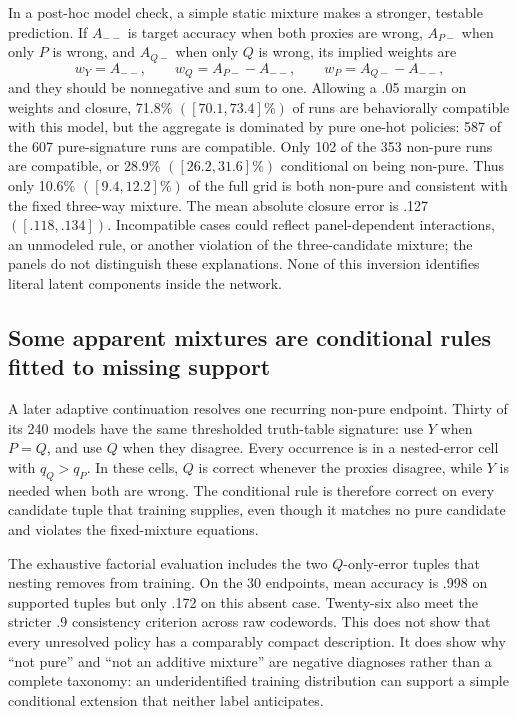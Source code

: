 \documentclass[11pt,a4paper]{article}
\begin{document}
In a post-hoc model check, a simple static mixture makes a stronger, testable prediction. If $A_{--}$ is target accuracy when both proxies are wrong, $A_{P-}$ when only $P$ is wrong, and $A_{Q-}$ when only $Q$ is wrong, its implied weights are
\[
w_Y=A_{--},\qquad w_Q=A_{P-}-A_{--},\qquad w_P=A_{Q-}-A_{--},
\]
and they should be nonnegative and sum to one. Allowing a .05 margin on weights and closure, 71.8\% $([70.1,73.4]\%)$ of runs are behaviorally compatible with this model, but the aggregate is dominated by pure one-hot policies: 587 of the 607 pure-signature runs are compatible. Only 102 of the 353 non-pure runs are compatible, or 28.9\% $([26.2,31.6]\%)$ conditional on being non-pure. Thus only 10.6\% $([9.4,12.2]\%)$ of the full grid is both non-pure and consistent with the fixed three-way mixture. The mean absolute closure error is .127 $([.118,.134])$. Incompatible cases could reflect panel-dependent interactions, an unmodeled rule, or another violation of the three-candidate mixture; the panels do not distinguish these explanations. None of this inversion identifies literal latent components inside the network.

\subsection*{Some apparent mixtures are conditional rules fitted to missing support}

A later adaptive continuation resolves one recurring non-pure endpoint. Thirty of its 240 models have the same thresholded truth-table signature: use $Y$ when $P=Q$, and use $Q$ when they disagree. Every occurrence is in a nested-error cell with $q_Q>q_P$. In these cells, $Q$ is correct whenever the proxies disagree, while $Y$ is needed when both are wrong. The conditional rule is therefore correct on every candidate tuple that training supplies, even though it matches no pure candidate and violates the fixed-mixture equations.

The exhaustive factorial evaluation includes the two $Q$-only-error tuples that nesting removes from training. On the 30 endpoints, mean accuracy is .998 on supported tuples but only .172 on this absent case. Twenty-six also meet the stricter .9 consistency criterion across raw codewords. This does not show that every unresolved policy has a comparably compact description. It does show why ``not pure'' and ``not an additive mixture'' are negative diagnoses rather than a complete taxonomy: an underidentified training distribution can support a simple conditional extension that neither label anticipates.
\end{document}

